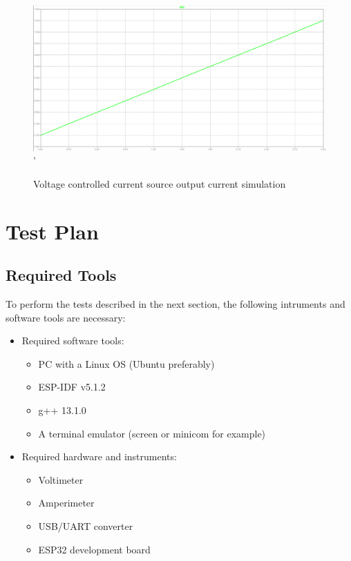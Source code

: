 \documentclass[10pt,twocolumn,letterpaper]{article}
\begin{document}
\begin{figure}[htb]
  \centering
  \includegraphics[width=\linewidth, keepaspectratio]{figures/current-source-output.png}'
  \caption{Voltage controlled current source output current simulation}
  \label{fig:sim-current-source-output-current}
\end{figure}


\section{Test Plan} \label{app:test-plan}

\subsection{Required Tools}

To perform the tests described in the next section, the following intruments and software tools are necessary:

\begin{itemize}
  \item Required software tools:
  \begin{itemize}
    \item PC with a Linux OS (Ubuntu preferably)
    \item ESP-IDF v5.1.2
    \item g++ 13.1.0
    \item A terminal emulator (screen or minicom for example)
  \end{itemize}

  \item Required hardware and instruments:
  \begin{itemize}
    \item Voltimeter
    \item Amperimeter
    \item USB/UART converter
    \item ESP32 development board
  \end{itemize}
\end{itemize}
\end{document}
